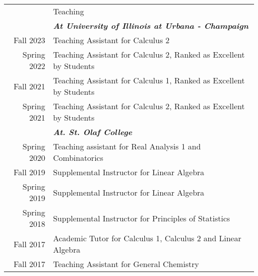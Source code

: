 \documentclass[letterpaper, 11pt]{article}
\newcommand{\headingfont}{\Large\color{Red}}
\newenvironment{SectionTable}[1]{
	\renewcommand*{\arraystretch}{1.7}
	\setlength{\tabcolsep}{10pt}
	\begin{longtable}{Rp{5.2in}} & #1 \\}
	{\end{longtable}\vspace{-.3cm}}
\begin{document}
	\begin{SectionTable}{\headingfont Teaching}
		& \textit{\textbf{At University of Illinois at Urbana - Champaign}}\\
		Fall 2023 & 
		Teaching Assistant for Calculus 2\\

		Spring 2022 & 
		Teaching Assistant for Calculus 2, Ranked as Excellent by Students\\
		
		Fall 2021 & 
		Teaching Assistant for Calculus 1, Ranked as Excellent by Students\\
	
		Spring 2021 & 
		Teaching Assistant for Calculus 2, Ranked as Excellent by Students\\
		
		& \textit{\textbf{At. St. Olaf College}} \\
		Spring 2020 & 
		Teaching assistant for Real Analysis 1 and Combinatorics \\
		Fall 2019 & 
		Supplemental Instructor for Linear Algebra\\
		Spring 2019 & 
		Supplemental Instructor for Linear Algebra\\
		Spring 2018 & 
		Supplemental Instructor for Principles of Statistics\\
		Fall 2017 & 
		Academic Tutor for Calculus 1, Calculus 2 and Linear Algebra\\
		Fall 2017 & 
		Teaching Assistant for General Chemistry  \\
	
		

	\end{SectionTable}

		
\end{document}
